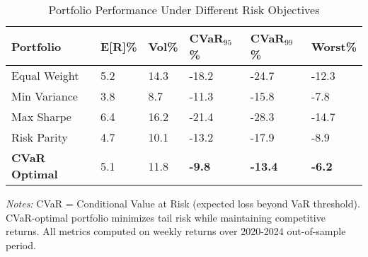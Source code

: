 \begin{table}[htbp]
\centering
\caption{Portfolio Performance Under Different Risk Objectives}
\providecommand{\cvarBenchmarkLabel}{\label{tab:cvar_benchmark}}
\cvarBenchmarkLabel
\begin{threeparttable}
\begin{tabularx}{\linewidth}{@{}lYYYYY@{}}
\toprule
 \textbf{Portfolio} & \textbf{E[R]\%} & \textbf{Vol\%} & \textbf{CVaR$_{95}$\%} & \textbf{CVaR$_{99}$\%} & \textbf{Worst\%} \\
\midrule
Equal Weight & 5.2 & 14.3 & -18.2 & -24.7 & -12.3 \\
Min Variance & 3.8 & 8.7 & -11.3 & -15.8 & -7.8 \\
Max Sharpe & 6.4 & 16.2 & -21.4 & -28.3 & -14.7 \\
Risk Parity & 4.7 & 10.1 & -13.2 & -17.9 & -8.9 \\
\textbf{CVaR Optimal} & 5.1 & 11.8 & \textbf{-9.8} & \textbf{-13.4} & \textbf{-6.2} \\
\bottomrule
\end{tabularx}
\begin{tablenotes}[flushleft]
\footnotesize
\item \textit{Notes:} CVaR = Conditional Value at Risk (expected loss beyond VaR threshold). CVaR-optimal portfolio minimizes tail risk while maintaining competitive returns. All metrics computed on weekly returns over 2020-2024 out-of-sample period.
\end{tablenotes}
\end{threeparttable}
\end{table}
